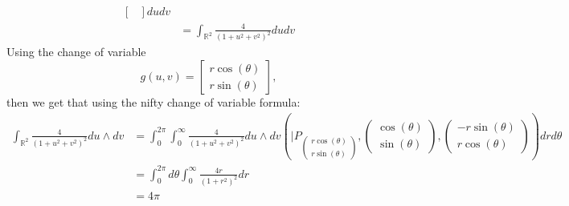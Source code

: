 \documentclass[11pt]{article}
\newcommand{\bbR}{\mathbb{R}}
\begin{document}
\begin{itemize}
\begin{solution}
\begin{align*}
\begin{bmatrix}
 \end{bmatrix} du dv\\
 &= \int_{\bbR^2} \frac{4}{(1 + u^2 + v^2)^2}dudv
\end{align*}
Using the change of variable 
\[g(u,v) = \begin{bmatrix}
    r\cos(\theta)\\
    r\sin(\theta)
\end{bmatrix},\] then we get that using the nifty change of variable formula:
\begin{align*}
\int_{\bbR^2}  \frac{4}{(1 + u^2 + v^2)^2}du\wedge dv &= \int_0^{2\pi}\int_0^\infty \frac{4}{(1 + u^2 + v^2)^2}du\wedge dv \left(|P_{\begin{pmatrix}
    r\cos(\theta)\\
    r\sin(\theta)
\end{pmatrix}}, \begin{pmatrix}
    \cos(\theta) \\ \sin(\theta) 
\end{pmatrix}, \begin{pmatrix}
    -r\sin(\theta)\\r\cos(\theta)
\end{pmatrix}\right)drd\theta  \\
&= \int_0^{2\pi}d\theta\int_0^\infty \frac{4r}{(1 + r^2)^2} dr\\
&= 4\pi
\end{align*}


    
\end{solution}


\end{itemize}
\end{document}
